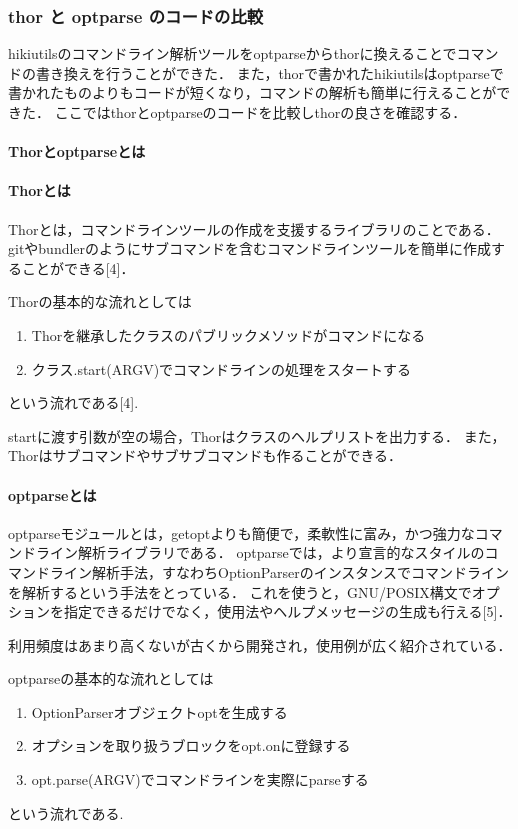 
\subsubsection{thor と optparse のコードの比較}
hikiutilsのコマンドライン解析ツールをoptparseからthorに換えることでコマンドの書き換えを行うことができた．
また，thorで書かれたhikiutilsはoptparseで書かれたものよりもコードが短くなり，コマンドの解析も簡単に行えることができた．
ここではthorとoptparseのコードを比較しthorの良さを確認する．

\paragraph{Thorとoptparseとは}
\paragraph{Thorとは}
Thorとは，コマンドラインツールの作成を支援するライブラリのことである．
gitやbundlerのようにサブコマンドを含むコマンドラインツールを簡単に作成することができる[4]．

Thorの基本的な流れとしては

\begin{enumerate}
\item Thorを継承したクラスのパブリックメソッドがコマンドになる
\item クラス.start(ARGV)でコマンドラインの処理をスタートする
\end{enumerate}
という流れである[4].

startに渡す引数が空の場合，Thorはクラスのヘルプリストを出力する．
また，Thorはサブコマンドやサブサブコマンドも作ることができる．

\paragraph{optparseとは}
optparseモジュールとは，getoptよりも簡便で，柔軟性に富み，かつ強力なコマンドライン解析ライブラリである．
optparseでは，より宣言的なスタイルのコマンドライン解析手法，すなわちOptionParserのインスタンスでコマンドラインを解析するという手法をとっている．
これを使うと，GNU/POSIX構文でオプションを指定できるだけでなく，使用法やヘルプメッセージの生成も行える[5]．

利用頻度はあまり高くないが古くから開発され，使用例が広く紹介されている．

optparseの基本的な流れとしては

\begin{enumerate}
\item OptionParserオブジェクトoptを生成する
\item オプションを取り扱うブロックをopt.onに登録する
\item opt.parse(ARGV)でコマンドラインを実際にparseする
\end{enumerate}
という流れである.

